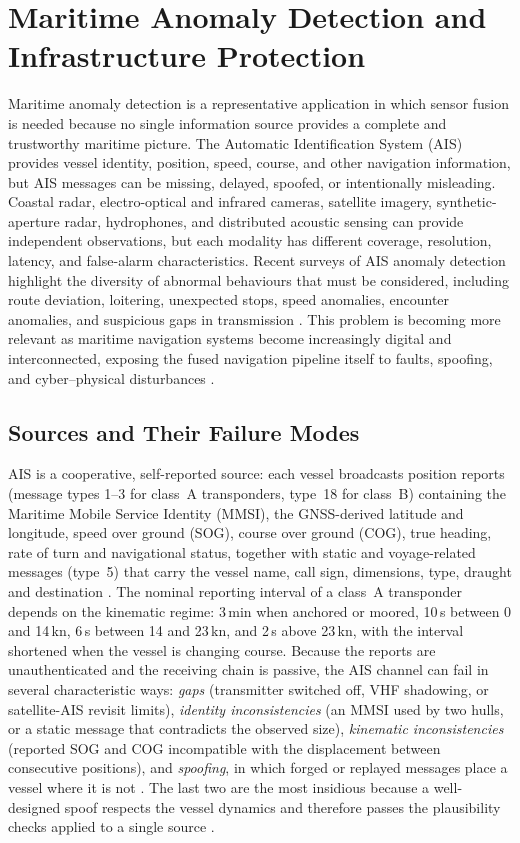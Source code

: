 \section{Maritime Anomaly Detection and Infrastructure Protection}

Maritime anomaly detection is a representative application in which sensor fusion is needed because no single information source provides a complete and trustworthy maritime picture. The Automatic Identification System (AIS) provides vessel identity, position, speed, course, and other navigation information, but AIS messages can be missing, delayed, spoofed, or intentionally misleading. Coastal radar, electro-optical and infrared cameras, satellite imagery, synthetic-aperture radar, hydrophones, and distributed acoustic sensing can provide independent observations, but each modality has different coverage, resolution, latency, and false-alarm characteristics. Recent surveys of AIS anomaly detection highlight the diversity of abnormal behaviours that must be considered, including route deviation, loitering, unexpected stops, speed anomalies, encounter anomalies, and suspicious gaps in transmission \cite{wolsing_anomaly_2022}. This problem is becoming more relevant as maritime navigation systems become increasingly digital and interconnected, exposing the fused navigation pipeline itself to faults, spoofing, and cyber--physical disturbances \cite{oliva_innovation_2026}.
\subsection{Sources and Their Failure Modes}
AIS is a cooperative, self-reported source: each vessel broadcasts position reports (message types 1--3 for class~A transponders, type~18 for class~B) containing the Maritime Mobile Service Identity (MMSI), the GNSS-derived latitude and longitude, speed over ground (SOG), course over ground (COG), true heading, rate of turn and navigational status, together with static and voyage-related messages (type~5) that carry the vessel name, call sign, dimensions, type, draught and destination \cite{itu_m1371_2014}. The nominal reporting interval of a class~A transponder depends on the kinematic regime: 3\,min when anchored or moored, 10\,s between 0 and 14\,kn, $6$\,s between 14 and 23\,kn, and 2\,s above 23\,kn, with the interval shortened when the vessel is changing course. Because the reports are unauthenticated and the receiving chain is passive, the AIS channel can fail in several characteristic ways: \emph{gaps} (transmitter switched off, VHF shadowing, or satellite-AIS revisit limits), \emph{identity inconsistencies} (an MMSI used by two hulls, or a static message that contradicts the observed size), \emph{kinematic inconsistencies} (reported SOG and COG incompatible with the displacement between consecutive positions), and \emph{spoofing}, in which forged or replayed messages place a vessel where it is not \cite{balduzzi_ais_2014}. The last two are the most insidious because a well-designed spoof respects the vessel dynamics and therefore passes the plausibility checks applied to a single source \cite{riveiro_review_2018}.


